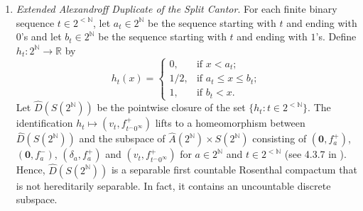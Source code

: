 \begin{example}
\begin{enumerate}
Another way to present this space is as the space $K\times\{0,1\}$ with the identifications
$(a,0)\mapsto g_a^0$ and $(a,1)\mapsto g_a^1$ and the
basic open neighborhoods are given asabove.
We can also embed $\mathrm{D}(K)$ into the product $A(K)\times K$ by identifying $(a,0)\mapsto (\mathbf{0},a)$ and $(a,1)\mapsto (\delta_a,a)$.

Notice that $\mathrm{D}(K)$ is a first countable Rosenthal compactum.
It is not separable if $K$ is uncountable; thus, we typically study the interesting case when $K=2^\mathbb{N}$.

As with the Alexandroff compactification $A(2^{\mathbb{N}})$, we can make the space $\mathrm{D}(2^{\mathbb{N}})$ separable  by ``softening'' the neighborhoods of each point through the addition of a countable set.
For example, the closure of the set $\{(v_s,s^\frown 0^\infty):s\in 2^{<\mathbb{N}}\}\subseteq \hat{A}(2^{\mathbb{N}})\times 2^{\mathbb{N}}$ is $\{(\mathbf{0},a):a\in 2^{\mathbb{N}}\}\cup \{(\delta_a,a):a\in 2^{\mathbb{N}}\}\cup\{(v_s,s^\frown 0^\infty):s\in 2^{<\mathbb{N}}\}$, where $\{(\mathbf{0},a):a\in 2^{\mathbb{N}}\}\cup \{(\delta_a,a):a\in 2^{\mathbb{N}}\}$ is homeomorphic to $\mathrm{D}(2^{\mathbb{N}})$.

    \item \emph{Extended Alexandroff Duplicate of the Split Cantor}.
    For each finite binary sequence $t\in 2^{<\mathbb{N}}$, let $a_t\in 2^\mathbb{N}$ be the sequence starting with $t$ and ending with $0$'s and let $b_t\in 2^\mathbb{N}$ be the sequence starting with $t$ and ending with $1$'s.
    Define $h_t\colon 2^\mathbb{N}\to\mathbb{R}$ by
    \[
	h_t(x)=\begin{cases}
        0, & \text{if }x<a_t;\\
        1/2, & \text{if }a_t\leq x \leq b_t;\\
        1, & \text{if }b_t<x.
    \end{cases}
    \]
    Let $\hat{D}(S(2^\mathbb{N}))$ be the pointwise closure of the set $\{h_t:t\in 2^{<\mathbb{N}}\}$.
    The identification $h_t\mapsto (v_t,f_{t^\frown 0^\infty}^+)$ lifts to a homeomorphism between $\hat{D}(S(2^\mathbb{N}))$ and the subspace of $\hat{A}(2^\mathbb{N})\times S(2^\mathbb{N})$ consisting of $(\mathbf{0},f_a^+)$, $(\mathbf{0},f_a^-)$, $(\delta_a,f_a^+)$ and $(v_t,f_{t^\frown 0^\infty}^+)$ for $a\in 2^{\mathbb{N}}$ and $t\in 2^{<\mathbb{N}}$ (see 4.3.7 in \cite{argyros2008rosenthal}).
Hence, $\hat{D}(S(2^\mathbb{N}))$ is a separable first countable Rosenthal compactum that is not hereditarily separable.
In fact, it contains an uncountable discrete subspace.
\end{enumerate}

\end{example}

